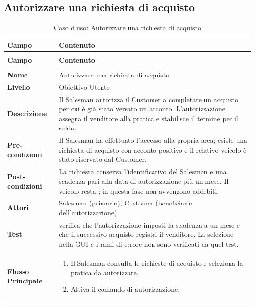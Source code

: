 \subsection{Autorizzare una richiesta di acquisto}\label{sec:uc-autorizzazione}
\begin{xltabular}{\textwidth}{| >{\bfseries}p{.22\textwidth} | >{\raggedright\arraybackslash}X |}
\caption{Caso d'uso: Autorizzare una richiesta di acquisto}\label{tab:uc-autorizzazione}\\
\hline
{} Campo & \textbf{Contenuto}\\\hline
\endfirsthead
{}\\
\hline
{} Campo & \textbf{Contenuto}\\\hline
\endhead
\hline
{}\\
\endfoot
\endlastfoot
Nome & Autorizzare una richiesta di acquisto\\\hline
Livello & Obiettivo Utente\\\hline
Descrizione & Il Salesman autorizza il Customer a completare un acquisto per cui è già stato versato un acconto. L'autorizzazione assegna il venditore alla pratica e stabilisce il termine per il saldo.\\\hline
Pre-condizioni & Il Salesman ha effettuato l'accesso alla propria area; esiste una richiesta di acquisto con acconto positivo e il relativo veicolo è stato riservato dal Customer.\\\hline
Post-condizioni & La richiesta conserva l'identificativo del Salesman e una scadenza pari alla data di autorizzazione più un mese. Il veicolo resta ; in questa fase non avvengono addebiti.\\\hline
Attori & Salesman (primario), Customer (beneficiario dell'autorizzazione)\\\hline
Test &  verifica che l'autorizzazione imposti la scadenza a un mese e che il successivo acquisto registri il venditore. La selezione nella GUI e i rami di errore non sono verificati da quel test.\\\hline
Flusso Principale &
\begin{enumerate}[label=\arabic*.,start=1,leftmargin=*,nosep]
  \item Il Salesman consulta le richieste di acquisto e seleziona la pratica da autorizzare.
  \item Attiva il comando di autorizzazione.

\end{enumerate}
\end{xltabular}
